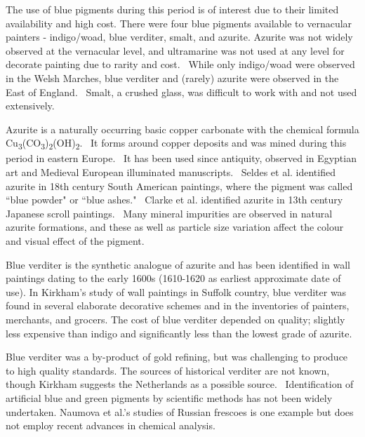 The use of blue pigments during this period is of interest due to their limited availability and high cost. There were four blue pigments available to vernacular painters - indigo/woad, blue verditer, smalt, and azurite. Azurite was not widely observed at the vernacular level, and ultramarine was not used at any level for decorate painting due to rarity and cost.~\autocite{Kirkham_thesis} While only indigo/woad were observed in the Welsh Marches, blue verditer and (rarely) azurite were observed in the East of England.~\autocite{Baird_thesis,Davies_book,Kirkham_thesis} Smalt, a crushed glass, was difficult to work with and not used extensively.~\autocite{Kirkham_thesis}

Azurite is a naturally occurring basic copper carbonate with the chemical formula Cu\textsubscript{3}(CO\textsubscript{3})\textsubscript{2}(OH)\textsubscript{2}.~\autocite{Aru,Smieska} It forms around copper deposits and was mined during this period in eastern Europe.~\autocite{Aru} It has been used since antiquity, observed in Egyptian art and Medieval European illuminated manuscripts.~\autocite{Smieska} Seldes et al. identified azurite in 18th century South American paintings, where the pigment was called ``blue powder" or ``blue ashes."~\autocite{Seldes} Clarke et al. identified azurite in 13th century Japanese scroll paintings.~\autocite{Clarke} Many mineral impurities are observed in natural azurite formations, and these as well as particle size variation affect the colour and visual effect of the pigment.~\autocite{Smieska,Price,Cardell}

Blue verditer is the synthetic analogue of azurite and has been identified in wall paintings dating to the early 1600s (1610-1620 as earliest approximate date of use). In Kirkham's study of wall paintings in Suffolk country, blue verditer was found in several elaborate decorative schemes and in the inventories of painters, merchants, and grocers. The cost of blue verditer depended on quality; slightly less expensive than indigo and significantly less than the lowest grade of azurite.~\autocite{Kirkham_thesis} 

Blue verditer was a by-product of gold refining, but was challenging to produce to high quality standards. The sources of historical verditer are not known, though Kirkham suggests the Netherlands as a possible source.~\autocite{Kirkham_thesis,Kirby} Identification of artificial blue and green pigments by scientific methods has not been widely undertaken. Naumova et al.'s studies of Russian frescoes is one example but does not employ recent advances in chemical analysis.~\autocite{Naumova1994,Naumova1990}

